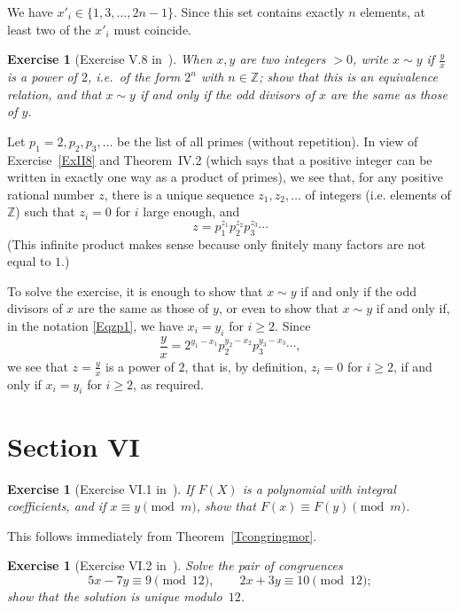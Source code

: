 \documentclass[12pt,letterpaper]{article}
\newcommand{\Z}{\mathbb{Z}}
\newtheorem{exer}[thm]{Exercise}
\theoremstyle{definition}
\begin{document}
We have $x'_i \in \{1, 3, \ldots, 2n-1\}$. Since this set contains exactly $n$ elements, at least two of the $x'_i$ must coincide. 

\begin{exer}[Exercise V.8 in~\cite{weil1979}]
When $x,y$ are two integers $>0$, write $x\sim y$ if $\frac{y}{x}$ is a power of $2$, i.e.\ of the form $2^n$ with $n\in\Z$; show that this is an equivalence relation, and that $x\sim y$ if and only if the odd divisors of $x$ are the same as those of $y$.
\end{exer} 

Let $p_1=2, p_2, p_3, \ldots$ be the list of all primes (without repetition). In view of Exercise~\ref{ExII8} and Theorem~IV.2 (which says that a positive integer can be written in exactly one way as a product of primes), we see that, for any positive rational number $z$, there is a unique sequence $z_1, z_2, \ldots$ of integers (i.e. elements of $\Z$) such that $z_i=0$ for $i$ large enough, and 
\begin{equation}\label{Eqzp1}
z = p_1^{z_1} p_2^{z_2} p_3^{z_3} \cdots 
\end{equation} 
(This infinite product makes sense because only finitely many factors are not equal to $1$.) 

To solve the exercise, it is enough to show that $x\sim y$ if and only if the odd divisors of $x$ are the same as those of $y$, or even to show that $x\sim y$ if and only if, in the notation \eqref{Eqzp1}, we have $x_i = y_i$ for $i \ge 2$. Since 
$$ 
\frac{y}{x} = 2^{y_1-x_1} p_2^{y_2-x_2} p_3^{y_3-x_3} \cdots,
$$ 
we see that $z=\frac{y}{x}$ is a power of $2$, that is, by definition, $z_i = 0$ for $i \ge 2$, if and only if $x_i = y_i$ for $i \ge 2$, as required. 

\section{Section VI} %

\begin{exer}[Exercise VI.1 in~\cite{weil1979}]\label{ExVI1}
If $F(X)$ is a polynomial with integral coefficients, and if $x \equiv y \pmod{m}$, show that $F(x) \equiv F(y) \pmod{m}$. 
\end{exer} 

This follows immediately from Theorem~\ref{Tcongringmor}. 

\begin{exer}[Exercise VI.2 in~\cite{weil1979}]
Solve the pair of congruences
\[
5x-7y\equiv 9\pmod{12}, \qquad 2x+3y\equiv 10\pmod{12};
\]
show that the solution is unique modulo~$12$.
\end{exer} 
\end{document}
